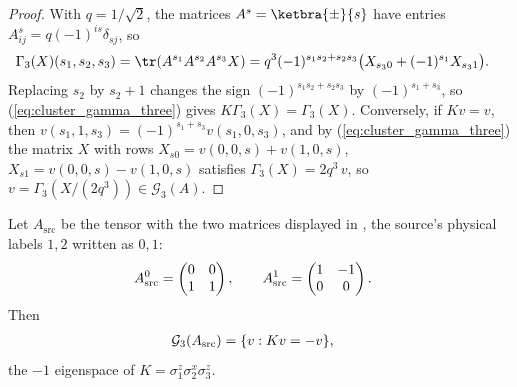 \begin{proof}
    \leanok
    With $q = 1/\sqrt2$, the matrices $A^s = \ketbra{\pm}{s}$ have entries
    $A^s_{ij} = q(-1)^{is}\delta_{sj}$, so
    \begin{align}
        \Gamma_3(X)(s_1,s_2,s_3)
         & = \tr(A^{s_1}A^{s_2}A^{s_3}X)
        = q^3(-1)^{s_1s_2+s_2s_3}
        \bigl(X_{s_30} + (-1)^{s_1}X_{s_31}\bigr).
        \label{eq:cluster_gamma_three}
    \end{align}
    Replacing $s_2$ by $s_2+1$ changes the sign $(-1)^{s_1s_2+s_2s_3}$ by
    $(-1)^{s_1+s_3}$, so (\ref{eq:cluster_gamma_three}) gives
    $K\Gamma_3(X) = \Gamma_3(X)$. Conversely, if $Kv = v$, then
    $v(s_1,1,s_3) = (-1)^{s_1+s_3}v(s_1,0,s_3)$, and by
    (\ref{eq:cluster_gamma_three}) the matrix $X$ with rows
    $X_{s0} = v(0,0,s) + v(1,0,s)$, $X_{s1} = v(0,0,s) - v(1,0,s)$ satisfies
    $\Gamma_3(X) = 2q^3\,v$, so $v = \Gamma_3(X/(2q^3)) \in \mathcal G_3(A)$.
\end{proof}

\begin{lemma}
    \label{thm:cluster_source_ground_space_three_eigenspace}
    \leanok
    Let $A_{\mathrm{src}}$ be the tensor with the two matrices displayed in
    \cite[local TeX lines~378--387]{PerezGarcia2007Matrix}, the source's
    physical labels $1,2$ written as $0,1$:
    \begin{align}
        A_{\mathrm{src}}^0
         & = \begin{pmatrix} 0 & 0 \\ 1 & 1 \end{pmatrix},
        \qquad
        A_{\mathrm{src}}^1
        = \begin{pmatrix} 1 & -1 \\ 0 & 0 \end{pmatrix}.
        \notag
    \end{align}
    Then
    \begin{align}
        \mathcal G_3(A_{\mathrm{src}})
         & = \{v : Kv = -v\},
        \notag
    \end{align}
    the $-1$ eigenspace of $K = \sigma^z_1\sigma^x_2\sigma^z_3$.
\end{lemma}

